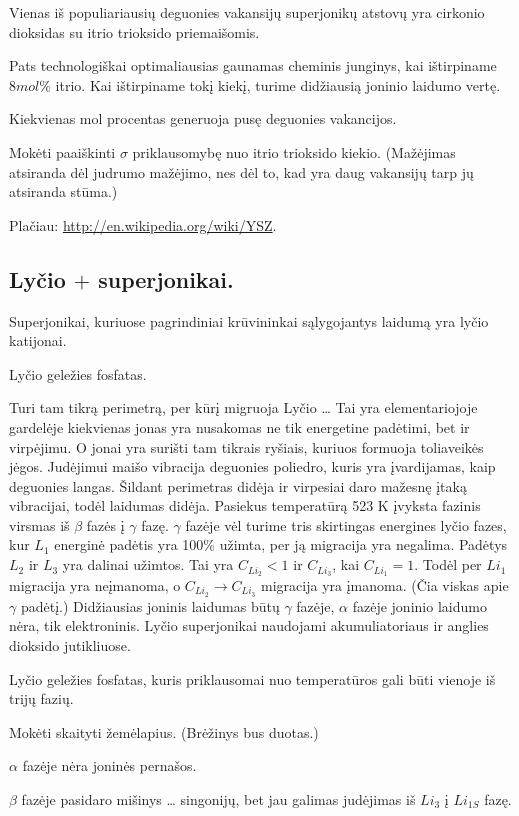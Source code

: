 \begin{remember}
  \item Vienas iš populiariausių deguonies vakansijų superjonikų
    atstovų yra cirkonio dioksidas su itrio trioksido priemaišomis.
  \item Pats technologiškai optimaliausias gaunamas cheminis
    junginys, kai ištirpiname $8 mol \%$ itrio. Kai ištirpiname tokį
    kiekį, turime didžiausią joninio laidumo vertę.
  \item Kiekvienas mol procentas generuoja pusę deguonies vakancijos.
  \item Mokėti paaiškinti $\sigma$ priklausomybę nuo itrio trioksido
    kiekio. (Mažėjimas atsiranda dėl judrumo mažėjimo, nes dėl
    to, kad yra daug vakansijų tarp jų atsiranda stūma.)
\end{remember}

Plačiau: \url{http://en.wikipedia.org/wiki/YSZ}.

\subsection{Lyčio $+$ superjonikai.}

Superjonikai, kuriuose pagrindiniai krūvininkai sąlygojantys laidumą
yra lyčio katijonai.

Lyčio geležies fosfatas.

Turi tam tikrą perimetrą, per kūrį migruoja Lyčio … Tai yra
elementariojoje gardelėje kiekvienas jonas yra nusakomas ne tik
energetine padėtimi, bet ir virpėjimu. O jonai yra surišti
tam tikrais ryšiais, kuriuos formuoja toliaveikės jėgos.
Judėjimui maišo vibracija deguonies poliedro, kuris yra
įvardijamas, kaip deguonies langas. Šildant perimetras didėja
ir virpesiai daro mažesnę įtaką vibracijai, todėl laidumas didėja.
Pasiekus temperatūrą 523 K įvyksta fazinis virsmas iš
$\beta$ fazės į $\gamma$ fazę. $\gamma$ fazėje vėl turime
tris skirtingas energines lyčio fazes, kur $L_{1}$ energinė
padėtis yra 100\% užimta, per ją migracija yra negalima.
Padėtys $L_{2}$ ir $L_{3}$ yra dalinai užimtos. Tai yra
$C_{Li_{2}} < 1$ ir $C_{Li_{3}}$, kai $C_{Li_{1}} = 1$. Todėl
per $Li_{1}$ migracija yra neįmanoma, o $C_{Li_{2}} → C_{Li_{3}}$
migracija yra įmanoma. (Čia viskas apie $\gamma$ padėtį.)
Didžiausias joninis laidumas būtų $\gamma$ fazėje, $\alpha$
fazėje joninio laidumo nėra, tik elektroninis. Lyčio
superjonikai naudojami akumuliatoriaus ir anglies dioksido
jutikliuose.

\begin{remember}
  \item Lyčio geležies fosfatas, kuris priklausomai nuo temperatūros
    gali būti vienoje iš trijų fazių.
  \item Mokėti skaityti žemėlapius. (Brėžinys bus duotas.)
  \item $\alpha$ fazėje nėra joninės pernašos.
  \item $\beta$ fazėje pasidaro mišinys … singonijų, bet 
    jau galimas judėjimas iš $Li_{3}$ į $Li_{1S}$ fazę.
\end{remember}

